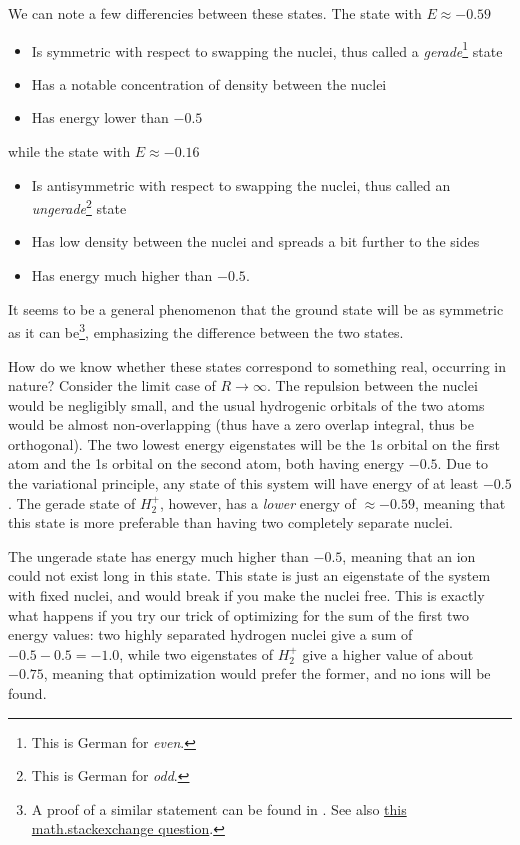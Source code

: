 \documentclass{article}
\begin{document}
We can note a few differencies between these states. The state with \(E\approx-0.59\)

\begin{itemize}
\item Is symmetric with respect to swapping the nuclei, thus called a \textit{gerade}\footnote{This is German for \textit{even}.} state
\item Has a notable concentration of density between the nuclei
\item Has energy lower than \(-0.5\)
\end{itemize}

while the state with \(E\approx-0.16\)

\begin{itemize}
\item Is antisymmetric with respect to swapping the nuclei, thus called an \textit{ungerade}\footnote{This is German for \textit{odd}.} state
\item Has low density between the nuclei and spreads a bit further to the sides
\item Has energy much higher than \(-0.5\).
\end{itemize}

It seems to be a general phenomenon that the ground state will be as symmetric as it can be\footnote{A proof of a similar statement can be found in \cite{ref:lieb}. See also \href{https://math.stackexchange.com/questions/3564003/if-psi-is-an-eigenvector-of-delta-is-psi-an-eigenvector-as-well}{this math.stackexchange question}.}, emphasizing the difference between the two states.

 How do we know whether these states correspond to something real, occurring in nature? Consider the limit case of \(R \rightarrow \infty\). The repulsion between the nuclei would be negligibly small, and the usual hydrogenic orbitals of the two atoms would be almost non-overlapping (thus have a zero overlap integral, thus be orthogonal). The two lowest energy eigenstates will be the 1s orbital on the first atom and the 1s orbital on the second atom, both having energy \(-0.5\). Due to the variational principle, any state of this system will have energy of at least \(-0.5\). The gerade state of \(H_2^+\), however, has a \textit{lower} energy of \(\approx-0.59\), meaning that this state is more preferable than having two completely separate nuclei.

 The ungerade state has energy much higher than \(-0.5\), meaning that an ion could not exist long in this state. This state is just an eigenstate of the system with fixed nuclei, and would break if you make the nuclei free. This is exactly what happens if you try our trick of optimizing for the sum of the first two energy values: two highly separated hydrogen nuclei give a sum of \(-0.5-0.5=-1.0\), while two eigenstates of \(H_2^+\) give a higher value of about \(-0.75\), meaning that optimization would prefer the former, and no ions will be found.
\end{document}

